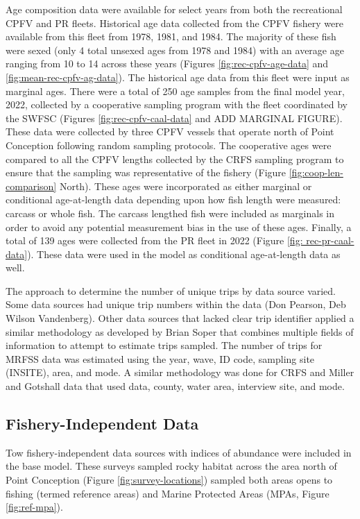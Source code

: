 \documentclass[11pt,
  english,
  letterpaper,
]{article}
\begin{document}
Age composition data were available for select years from both the recreational CPFV and PR fleets. Historical age data collected from the CPFV fishery were available from this fleet from 1978, 1981, and 1984. The majority of these fish were sexed (only 4 total unsexed ages from 1978 and 1984) with an average age ranging from 10 to 14 across these years (Figures \ref{fig:rec-cpfv-age-data} and \ref{fig:mean-rec-cpfv-ag-data}). The historical age data from this fleet were input as marginal ages. There were a total of 250 age samples from the final model year, 2022, collected by a cooperative sampling program with the fleet coordinated by the SWFSC (Figures \ref{fig:rec-cpfv-caal-data} and ADD MARGINAL FIGURE). These data were collected by three CPFV vessels that operate north of Point Conception following random sampling protocols. The cooperative ages were compared to all the CPFV lengths collected by the CRFS sampling program to ensure that the sampling was representative of the fishery (Figure \ref{fig:coop-len-comparison} North). These ages were incorporated as either marginal or conditional age-at-length data depending upon how fish length were measured: carcass or whole fish. The carcass lengthed fish were included as marginals in order to avoid any potential measurement bias in the use of these ages. Finally, a total of 139 ages were collected from the PR fleet in 2022 (Figure \ref{fig: rec-pr-caal-data}). These data were used in the model as conditional age-at-length data as well.

The approach to determine the number of unique trips by data source varied. Some data sources had unique trip numbers within the data (Don Pearson, Deb Wilson Vandenberg). Other data sources that lacked clear trip identifier applied a similar methodology as developed by Brian Soper that combines multiple fields of information to attempt to estimate trips sampled. The number of trips for MRFSS data was estimated using the year, wave, ID code, sampling site (INSITE), area, and mode. A similar methodology was done for CRFS and Miller and Gotshall data that used data, county, water area, interview site, and mode.

\hypertarget{fishery-independent-data}{%
\subsection{Fishery-Independent Data}\label{fishery-independent-data}}

\hfill\break

Tow fishery-independent data sources with indices of abundance were included in the base model. These surveys sampled rocky habitat across the area north of Point Conception (Figure \ref{fig:survey-locations}) sampled both areas opens to fishing (termed reference areas) and Marine Protected Areas (MPAs, Figure \ref{fig:ref-mpa}).
\end{document}

